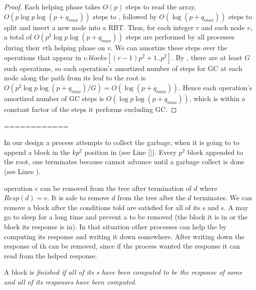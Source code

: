 \begin{proof}
Each helping phase takes $O(p)$ steps to read the  array,
$O(p \log p \log(p+q_{max}))$ steps to ,
followed by $O(\log(p+q_{max}))$ steps to split and insert a new node into a RBT.
Thus, for each integer $r$ and each node $v$, a total of $O(p^2\log p\log(p+q_{max}))$ steps
are performed by all processes during their $r$th helping phase on $v$.
We can amortize these steps over the operations that appear in 
$v.blocks[(r-1)p^2+1..p^2]$.
By , there are at least $G$ such operations, 
so each operation's amortized number of steps for GC at each node along the path from its leaf to the root
is $O(p^2\log p\log(p+q_{max})/G)=O(\log(p+q_{max}))$.
Hence each operation's amortized number of GC steps is $O(\log p\log(p+q_{max}))$, which is
within a constant factor of the steps it performs excluding GC.
\end{proof}


============

In our design a process attempts to collect the garbage, when it is going to to append a block in the $kp^2$ position in  (see Line \ref{}). Every $p^2$  block appended to the root, one  terminates because  cannot advance until a  garbage collect is done (see Lines ).

%

 operation $e$ can be removed from the tree after termination of  $d$ where $Resp(d)=e$. It is safe to remove  $d$ from the tree after the $d$ terminates. We can remove a block after the conditions told are satisfied for all of its s and s. A  may go to sleep for a long time and prevent a  to be removed (the block it is in or the block its response is in). In that situation other processes can help the  by computing its response and writing it down somewhere. After writing down the response of th  can be removed, since if the process wanted the response it can read from the helped response.

\begin{definition}
A block  is \it{finished} if all of its s have been computed to be the response of some  and all of its  responses have been computed.  
\end{definition}

